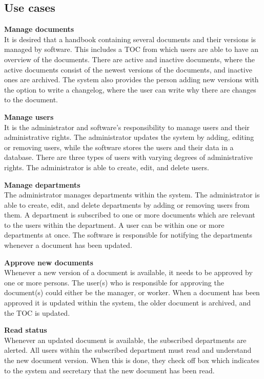 \subsection{Use cases} \label{sec:usecases}
\textbf{Manage documents}
\\
It is desired that a handbook containing several documents and their versions is managed by software.
This includes a TOC from which users are able to have an overview of the documents.
There are active and inactive documents, where the active documents consist of the newest versions of the documents, and inactive ones are archived.
The system also provides the person adding new versions with the option to write a changelog, where the user can write why there are changes to the document.

\textbf{Manage users}
\\
It is the administrator and software's responsibility to manage users and their administrative rights.
The administrator updates the system by adding, editing or removing users, while the software stores the users and their data in a database.
There are three types of users with varying degrees of administrative rights.
The administrator is able to create, edit, and delete users.

\textbf{Manage departments}
\\
The administrator manages departments within the system.
The administrator is able to create, edit, and delete departments by adding or removing users from them.
A department is subscribed to one or more documents which are relevant to the users within the department.
A user can be within one or more departments at once.
The software is responsible for notifying the departments whenever a document has been updated.

\textbf{Approve new documents}
\\
Whenever a new version of a document is available, it needs to be approved by one or more persons.
The user(s) who is responsible for approving the document(s) could either be the manager, or worker.
When a document has been approved it is updated within the system, the older document is archived, and the TOC is updated.

\textbf{Read status}
\\
Whenever an updated document is available, the subscribed departments are alerted.
All users within the subscribed department must read and understand the new document version.
When this is done, they check off box which indicates to the system and secretary that the new document has been read.
